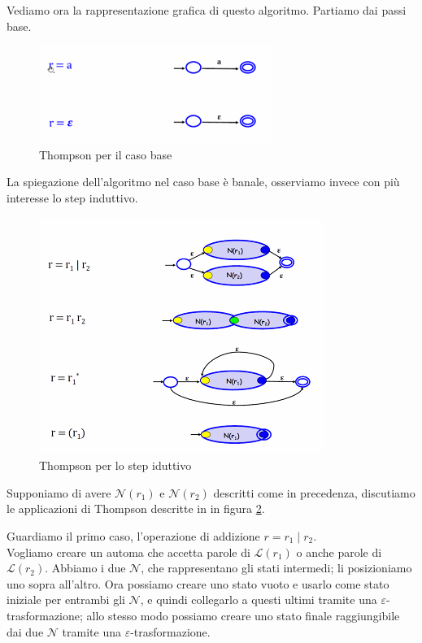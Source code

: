 \documentclass[class=book, crop=false, oneside, 12pt]{standalone}
\begin{document}
Vediamo ora la rappresentazione grafica di questo algoritmo. Partiamo dai passi base.

\begin{figure}
    \centering
    \includegraphics[width=.5\textwidth,keepaspectratio]{Thompson_base}
    \caption{Thompson per il caso base}
    \label{Thompson_base}
\end{figure}

\noindent La spiegazione dell'algoritmo nel caso base è banale, osserviamo invece con più interesse lo step induttivo.

\begin{figure}
    \centering
    \includegraphics[width=.7\textwidth,keepaspectratio]{Thompson_step}
    \caption{Thompson per lo step iduttivo}
    \label{Thompson_step}
\end{figure}
Supponiamo di avere \(\mathcal{N}(r_1)\) e \(\mathcal{N}(r_2)\) descritti come in precedenza, discutiamo le applicazioni di Thompson descritte in in figura \ref{Thompson_step}.

Guardiamo il primo caso, l'operazione di addizione \(r = r_1 \mid r_2\).\\
Vogliamo creare un automa che accetta parole di \(\mathcal{L}(r_1)\) o anche parole di \(\mathcal{L}(r_2)\).
Abbiamo i due \(\mathcal{N}\), che rappresentano gli stati intermedi; li posizioniamo uno sopra all’altro. Ora possiamo creare uno stato vuoto e usarlo come stato iniziale per entrambi gli \(\mathcal{N}\), e quindi collegarlo a questi ultimi tramite una \(\varepsilon\)-trasformazione; allo stesso modo possiamo creare uno stato finale raggiungibile dai due \(\mathcal{N}\) tramite una \(\varepsilon\)-trasformazione.
\end{document}

